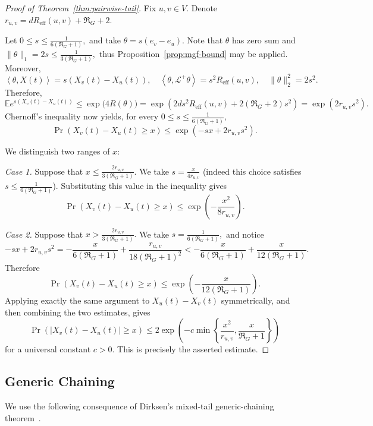 \documentclass[11pt]{article}
\numberwithin{equation}{section}
\newcommand{\E}{\mathbb{E}}
\newcommand{\1}{\mathbf{1}}
\newcommand{\ip}[2]{\left\langle #1,#2\right\rangle}
\begin{document}
\begin{proof}[Proof of Theorem~\ref{thm:pairwise-tail}]
Fix \(u,v\in V\). Denote 
\(
r_{u,v}
=
dR_{\mathrm{eff}}(u,v)+\Re_G+2.
\)

\medskip 

Let \(0\le s\le\frac{1}{6(\Re_G+1)},\) and take \(\theta=s(e_v-e_u).\) Note that \(\theta\) has zero sum and
\(
\|\theta\|_1=2s
\le
\frac{1}{3(\Re_G+1)},
\) thus Proposition~\ref{prop:mgf-bound} may be applied. Moreover,
\[
\ip{\theta}{X(t)}=s(X_v(t)-X_u(t)), \quad \ip{\theta}{\mathcal L^+\theta}
=
s^2R_{\mathrm{eff}}(u,v), \quad \|\theta\|_2^2=2s^2.
\]
Therefore,
\[
\E e^{s(X_v(t)-X_u(t))}
\le
\exp\bigl(4R(\theta)\bigr)
=
\exp\left(
2ds^2R_{\mathrm{eff}}(u,v)
+
2(\Re_G+2)s^2
\right)
=
\exp\left(
2r_{u,v}s^2
\right).
\]
Chernoff's inequality now yields, for every \(0\le s\le\frac{1}{6(\Re_G+1)}\),
\[
\Pr(X_v(t)-X_u(t)\ge x)
\le
\exp\left(
-sx+2r_{u,v}s^2
\right).
\]

\medskip

We distinguish two ranges of \(x\):

\medskip

\emph{Case 1.} Suppose that \( x \le \frac{2r_{u,v}}{3(\Re_G+1)}.\)
We take \( s=\frac{x}{4r_{u,v}}\) (indeed this choice
satisfies \(s\le \frac 1 {6(\Re_G+1)}\)). Substituting this value in the inequality gives
\[
\Pr(X_v(t)-X_u(t)\ge x)
\le
\exp\left(
-\frac{x^2}{8r_{u,v}}
\right).
\]

\emph{Case 2.} Suppose that \( x > \frac{2r_{u,v}}{3(\Re_G+1)}.
\)
We take \( s=\frac{1}{6(\Re_G+1)},\) and notice
\[
-sx+2r_{u,v}s^2
=
-\frac{x}{6(\Re_G+1)}
+
\frac{r_{u,v}}{18(\Re_G+1)^2}<-\frac{x}{6(\Re_G+1)}
+ \frac{x}{12(\Re_G+1)}.
\]
Therefore
\[
\Pr(X_v(t)-X_u(t)\ge x)
\le
\exp\left(
-\frac{x}{12(\Re_G+1)}
\right).
\]
Applying exactly the same argument to \(X_u(t)-X_v(t)\) symmetrically, and then combining the two estimates, gives
\[
\Pr\left(
|X_v(t)-X_u(t)|\ge x
\right)
\le
2\exp\left(
-c\min\left\{
\frac{x^2}{r_{u,v}},
\frac{x}{\Re_G+1}
\right\}
\right)
\]
for a universal constant \(c>0\). This is precisely the asserted estimate.
\end{proof}

\subsection{Generic Chaining}

We use the following consequence of Dirksen's mixed-tail generic-chaining theorem~\cite[Theorem~3.5]{DirksenGenericChaining}.
\end{document}
